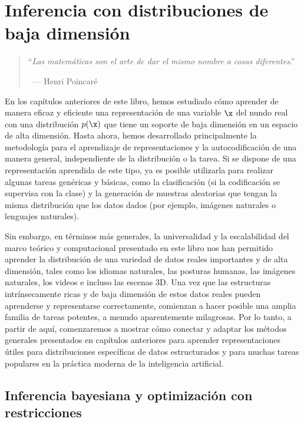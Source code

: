 \documentclass[../../book-main_es.tex]{subfiles}
\begin{document}
\chapter{Inferencia con distribuciones de baja dimensión}
\label{ch:conditional-inference}

\begin{quote}

    \hfill    ``{\em Las matemáticas son el arte de dar el mismo nombre 
    a cosas diferentes}.''

    $~$ \hfill --- Henri Poincar\'e
\end{quote}
\vspace{5mm}

En los capítulos anteriores de este libro, hemos estudiado cómo
aprender de manera eficaz y eficiente una representación de una variable
$\x$ del nundo real con una distribución $p(\x)$ que tiene un
soporte de baja dimensión en un espacio de alta dimensión. Hasta ahora, hemos
desarrollado principalmente la metodología para el aprendizaje de representaciones y
la autocodificación de una manera general, independiente de la distribución o la tarea.
Si se dispone de una representación aprendida de este tipo, ya es posible utilizarla para realizar
algunas tareas genéricas y básicas, como la clasificación (si la codificación
se supervisa con la clase) y la generación de muestras aleatorias que
tengan la misma distribución que los datos dados (por ejemplo, imágenes naturales o
lenguajes naturales).

Sin embargo, en términos más generales, la universalidad y la escalabilidad del
marco teórico y computacional presentado en este libro nos han
permitido aprender la distribución de una variedad de datos reales importantes y 
de alta dimensión, tales como los idiomas naturales, las
posturas humanas, las imágenes naturales, los videos e incluso las escenas 3D. Una vez que
las estructuras intrínsecamente ricas y de baja dimensión de estos datos reales
pueden aprenderse y representarse correctamente, comienzan a hacer posible una
amplia familia de tareas potentes, a menudo aparentemente milagrosas. Por lo tanto,
a partir de aquí, comenzaremos a mostrar cómo conectar y adaptar
los métodos generales presentados en capítulos anteriores para aprender representaciones útiles
para distribuciones específicas de datos estructurados y para
muchas tareas populares en la práctica moderna de la inteligencia artificial.

\section{Inferencia bayesiana y optimización con restricciones}
\end{document}
